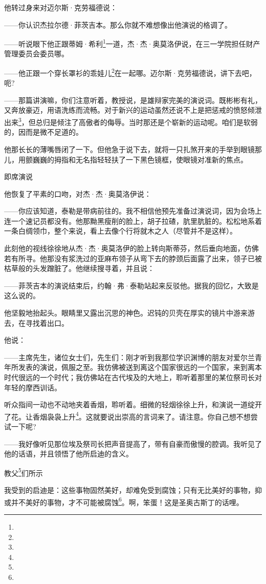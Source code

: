 \par 他转过身来对迈尔斯·克劳福德说：
\par ——你认识杰拉尔德·菲茨吉本。那么你就不难想像出他演说的格调了。
\par ——听说眼下他正跟蒂姆·希利\footnote{}一道，杰·杰·奥莫洛伊说，在三一学院担任财产管理委员会委员哪。
\par ——他正跟一个穿长罩衫的乖娃儿\footnote{}在一起哪。迈尔斯·克劳福德说，讲下去吧，呃?
\par ——那篇讲演嘛，你们注意听着，教授说，是雄辩家完美的演说词。既彬彬有礼，又奔放豪迈，用语洗练而流畅。对于新兴的运动虽然还说不上是把惩戒的愤怒倾泄出来\footnote{}，但总归是倾注了高傲者的侮辱。当时那还是个崭新的运动呢。咱们是软弱的，因而是微不足道的。
\par 他那长长的薄嘴唇闭了一下。但他急于说下去，就将一只扎煞开来的手举到眼镜那儿，用颤巍巍的拇指和无名指轻轻扶了一下黑色镜框，使眼镜对准新的焦点。
\par 即席演说
\par 他恢复了平素的口吻，对杰·杰·奥莫洛伊说：
\par ——你应该知道，泰勒是带病前往的。我不相信他预先准备过演说词，因为会场上连一个速记员都没有。他那黝黑瘦削的脸上，胡子拉碴，肮里肮脏的。松松地系着一条白绸领巾，整个来说，看上去像个行将就木之人（尽管并不是这样）。
\par 此刻他的视线徐徐地从杰·杰·奥莫洛伊的脸上转向斯蒂芬，然后垂向地面，仿佛若有所寻。他那没有浆洗过的亚麻布领子从弯下去的脖颈后面露了出来，领子已被枯草般的头发蹭脏了。他继续搜寻着，并且说：
\par ——菲茨吉本的演说结束后，约翰·弗·泰勒站起来反驳他。据我的回忆，大致是这么说的。
\par 他坚毅地抬起头。眼睛里又露出沉思的神色。迟钝的贝壳在厚实的镜片中游来游去，在寻找着出口。
\par 他说：
\par ——主席先生，诸位女士们，先生们：刚才听到我那位学识渊博的朋友对爱尔兰青年所发表的演说，佩服之至。我仿佛被送到离这个国家很远的一个国家，来到离本时代很远的一个时代；我仿佛站在古代埃及的大地上，聆听着那里的某位祭司长对年轻的摩西训话。
\par 听众指间一动也不动地夹着香烟，聆听着。细微的轻烟徐徐上升，和演说一道绽开了花。让香烟袅袅上升\footnote{}。这就要说出崇高的言词来了。请注意。你自己想不想尝试一下呢?
\par ——我好像听见那位埃及祭司长把声音提高了，带有自豪而傲慢的腔调。我听见了他的话语，并且领悟了他所启迪的含义。
\par 教父\footnote{}们所示
\par 我受到的启迪是：这些事物固然美好，却难免受到腐蚀；只有无比美好的事物，抑或并不美好的事物，才不可能被腐蚀\footnote{}。啊，笨蛋！这是圣奥古斯丁的话哩。
